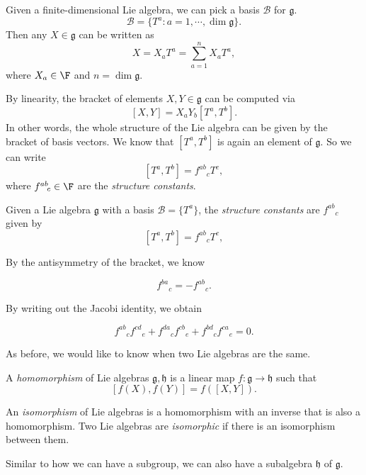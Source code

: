 \documentclass[a4paper]{article}
\begin{document}
Given a finite-dimensional Lie algebra, we can pick a basis $\mathcal{B}$ for $\mathfrak{g}$.
\[
  \mathcal{B} = \{T^a: a = 1, \cdots, \dim \mathfrak{g}\}.
\]
Then any $X \in \mathfrak{g}$ can be written as
\[
  X = X_a T^a = \sum_{a = 1}^n X_a T^a,
\]
where $X_a \in \F$ and $n = \dim \mathfrak{g}$.

By linearity, the bracket of elements $X, Y \in \mathfrak{g}$ can be computed via
\[
  [X, Y] = X_a Y_b [T^a, T^b].
\]
In other words, the whole structure of the Lie algebra can be given by the bracket of basis vectors. We know that $[T^a, T^b]$ is again an element of $\mathfrak{g}$. So we can write
\[
  [T^a, T^b] = f^{ab}\!_c T^c,
\]
where $f^{ab}\!_c\in \F$ are the \emph{structure constants}.
\begin{defi}
  Given a Lie algebra $\mathfrak{g}$ with a basis $\mathcal{B} = \{T^a\}$, the \emph{structure constants} are $f^{ab}\!_c$ given by
  \[
    [T^a, T^b] = f^{ab}\!_c T^c,
  \]
\end{defi}

By the antisymmetry of the bracket, we know
\begin{prop}
  \[
    f^{ba}\!_c = -f^{ab}\!_c.
  \]
\end{prop}

By writing out the Jacobi identity, we obtain
\begin{prop}
  \[
    f^{ab}\!_c f^{cd}\!_e + f^{da}\!_c f^{cb}\!_e + f^{bd}\!_c f^{ca}\!_e = 0.
  \]
\end{prop}

As before, we would like to know when two Lie algebras are the same.
\begin{defi}
  A \emph{homomorphism} of Lie algebras $\mathfrak{g}, \mathfrak{h}$ is a linear map $f: \mathfrak{g} \to \mathfrak{h}$ such that
  \[
    [f(X), f(Y)] = f([X, Y]).
  \]
\end{defi}

\begin{defi}
  An \emph{isomorphism} of Lie algebras is a homomorphism with an inverse that is also a homomorphism. Two Lie algebras are \emph{isomorphic} if there is an isomorphism between them.
\end{defi}

Similar to how we can have a subgroup, we can also have a subalgebra $\mathfrak{h}$ of $\mathfrak{g}$.
\end{document}
